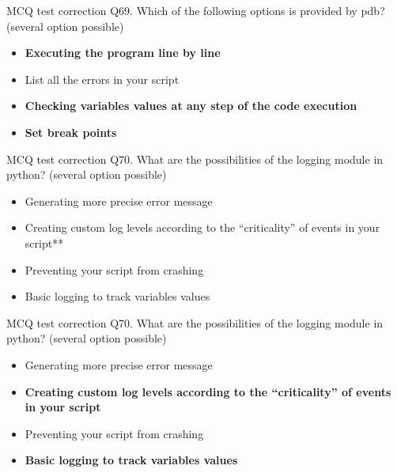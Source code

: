 \documentclass[
  8pt,
  ignorenonframetext,
]{beamer}
\providecommand{\tightlist}{%
  \setlength{\itemsep}{0pt}\setlength{\parskip}{0pt}}
\begin{document}
\begin{frame}{MCQ test correction}
\protect\hypertarget{mcq-test-correction-137}{}
Q69. Which of the following options is provided by pdb? (several option
possible)

\begin{itemize}
\tightlist
\item
  \textbf{Executing the program line by line}
\item
  List all the errors in your script
\item
  \textbf{Checking variables values at any step of the code execution}
\item
  \textbf{Set break points}
\end{itemize}
\end{frame}

\begin{frame}{MCQ test correction}
\protect\hypertarget{mcq-test-correction-138}{}
Q70. What are the possibilities of the logging module in python?
(several option possible)

\begin{itemize}
\tightlist
\item
  Generating more precise error message
\item
  Creating custom log levels according to the ``criticality'' of events
  in your script**
\item
  Preventing your script from crashing
\item
  Basic logging to track variables values
\end{itemize}
\end{frame}

\begin{frame}{MCQ test correction}
\protect\hypertarget{mcq-test-correction-139}{}
Q70. What are the possibilities of the logging module in python?
(several option possible)

\begin{itemize}
\tightlist
\item
  Generating more precise error message
\item
  \textbf{Creating custom log levels according to the ``criticality'' of
  events in your script}
\item
  Preventing your script from crashing
\item
  \textbf{Basic logging to track variables values}
\end{itemize}
\end{frame}
\end{document}
